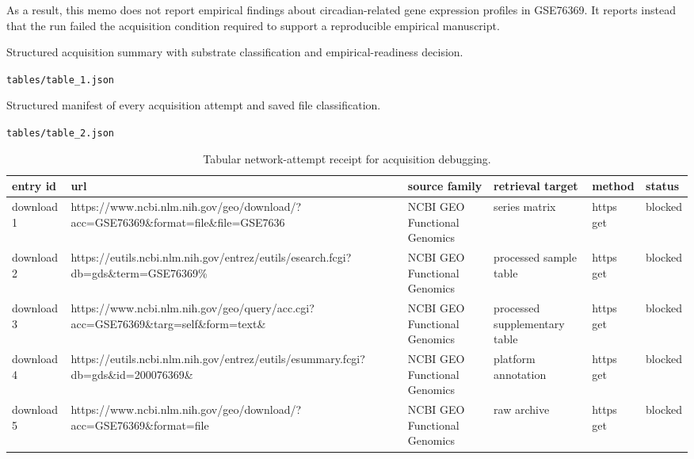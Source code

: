 \documentclass[11pt]{article}
\begin{document}
As a result, this memo does not report empirical findings about circadian-related gene expression profiles in GSE76369. It reports instead that the run failed the acquisition condition required to support a reproducible empirical manuscript.

\begin{table}[t]
\centering
\caption{Structured acquisition summary with substrate classification and empirical-readiness decision.}
\label{tab:data-access-report}
\texttt{tables/table\_1.json}
\end{table}

\begin{table}[t]
\centering
\caption{Structured manifest of every acquisition attempt and saved file classification.}
\label{tab:download-manifest}
\texttt{tables/table\_2.json}
\end{table}

\begin{table}[tbp]
\centering
\small
\caption{Tabular network-attempt receipt for acquisition debugging.}
\label{tab:network-attempts}
\begin{tabularx}{\linewidth}{>{\raggedright\arraybackslash}X>{\raggedright\arraybackslash}X>{\raggedright\arraybackslash}X>{\raggedright\arraybackslash}X>{\raggedright\arraybackslash}X>{\raggedright\arraybackslash}X}
\toprule
entry id & url & source family & retrieval target & method & status \\
\midrule
download 1 & https://www.ncbi.nlm.nih.gov/geo/download/?acc=GSE76369\&format=file\&file=GSE7636 & NCBI GEO Functional Genomics & series matrix & https get & blocked \\
download 2 & https://eutils.ncbi.nlm.nih.gov/entrez/eutils/esearch.fcgi?db=gds\&term=GSE76369\% & NCBI GEO Functional Genomics & processed sample table & https get & blocked \\
download 3 & https://www.ncbi.nlm.nih.gov/geo/query/acc.cgi?acc=GSE76369\&targ=self\&form=text\& & NCBI GEO Functional Genomics & processed supplementary table & https get & blocked \\
download 4 & https://eutils.ncbi.nlm.nih.gov/entrez/eutils/esummary.fcgi?db=gds\&id=200076369\& & NCBI GEO Functional Genomics & platform annotation & https get & blocked \\
download 5 & https://www.ncbi.nlm.nih.gov/geo/download/?acc=GSE76369\&format=file & NCBI GEO Functional Genomics & raw archive & https get & blocked \\
\bottomrule
\end{tabularx}
\end{table}
\end{document}
